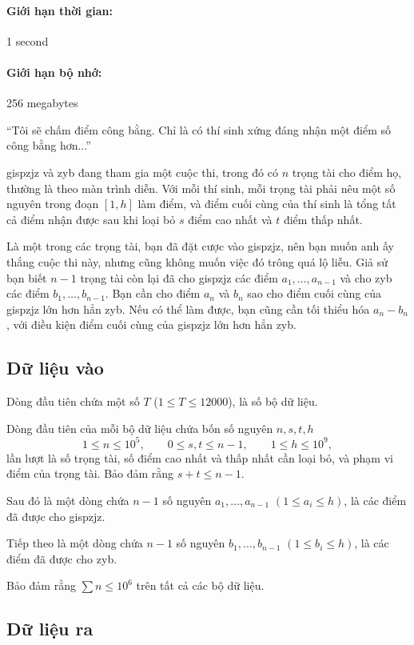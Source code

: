 \documentclass[11pt]{article}
\begin{document}
\paragraph{Giới hạn thời gian:} 1 second
\paragraph{Giới hạn bộ nhớ:} 256 megabytes

``Tôi sẽ chấm điểm công bằng. Chỉ là có thí sinh xứng đáng nhận một điểm số
công bằng hơn...''

gispzjz và zyb đang tham gia một cuộc thi, trong đó có \(n\) trọng tài cho
điểm họ, thường là theo màn trình diễn. Với mỗi thí sinh, mỗi trọng tài phải
nêu một số nguyên trong đoạn \([1,h]\) làm điểm, và điểm cuối cùng của thí
sinh là tổng tất cả điểm nhận được sau khi loại bỏ \(s\) điểm cao nhất và
\(t\) điểm thấp nhất.

Là một trong các trọng tài, bạn đã đặt cược vào gispzjz, nên bạn muốn anh ấy
thắng cuộc thi này, nhưng cũng không muốn việc đó trông quá lộ liễu. Giả sử
bạn biết \(n-1\) trọng tài còn lại đã cho gispzjz các điểm
\(a_1,\ldots,a_{n-1}\) và cho zyb các điểm \(b_1,\ldots,b_{n-1}\). Bạn cần
cho điểm \(a_n\) và \(b_n\) sao cho điểm cuối cùng của gispzjz lớn hơn hẳn
zyb. Nếu có thể làm được, bạn cũng cần tối thiểu hóa \(a_n-b_n\), với điều
kiện điểm cuối cùng của gispzjz lớn hơn hẳn zyb.

\subsection*{Dữ liệu vào}

Dòng đầu tiên chứa một số \(T\) (\(1\le T\le 12000\)), là số bộ dữ liệu.

Dòng đầu tiên của mỗi bộ dữ liệu chứa bốn số nguyên \(n,s,t,h\)
\[
  1\le n\le 10^5,\qquad 0\le s,t\le n-1,\qquad 1\le h\le 10^9,
\]
lần lượt là số trọng tài, số điểm cao nhất và thấp nhất cần loại bỏ, và phạm
vi điểm của trọng tài. Bảo đảm rằng \(s+t\le n-1\).

Sau đó là một dòng chứa \(n-1\) số nguyên \(a_1,\ldots,a_{n-1}\)
\((1\le a_i\le h)\), là các điểm đã được cho gispzjz.

Tiếp theo là một dòng chứa \(n-1\) số nguyên \(b_1,\ldots,b_{n-1}\)
\((1\le b_i\le h)\), là các điểm đã được cho zyb.

Bảo đảm rằng \(\sum n\le 10^6\) trên tất cả các bộ dữ liệu.

\subsection*{Dữ liệu ra}
\end{document}
